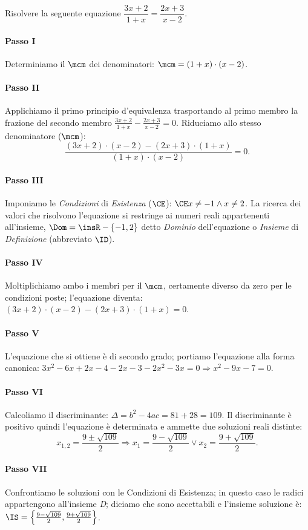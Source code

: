 \begin{esempio}
Risolvere la seguente equazione \(\dfrac{3 x + 2}{1 + x}=\dfrac{2 x + 3}{x - 2}\).
 \paragraph{Passo I} Determiniamo il \(\mcm\) dei denominatori: \(\mcm = ( 1 + x ) 
\cdot ( x - 2 )\).
 \paragraph{Passo II} Applichiamo il primo principio d'equivalenza 
trasportando 
al primo membro la frazione del secondo membro \(\frac{3 x + 2}{1 + x} - 
\frac{2 
x + 3}{x - 2} = 0\). Riduciamo allo stesso denominatore (\(\mcm\)): 
\[\frac{( 3 x + 2 ) \cdot ( x - 2 ) - ( 2 x + 3 ) \cdot ( 1 + x )}{( 1 +x ) 
\cdot ( x - 2 )}=0.\]
 \paragraph{Passo III} Imponiamo le \emph{Condizioni} di \emph{Esistenza} 
(\(\CE\)): \(\CE x \neq - 1 \wedge x \neq 2\). La ricerca dei valori che 
risolvono 
l'equazione si restringe ai numeri reali appartenenti all'insieme, \(\Dom = 
\insR 
- \{- 1, 2 \}\) detto \emph{Dominio} dell'equazione o \emph{Insieme} di 
\emph{Definizione} (abbreviato \(\ID\)).
 \paragraph{Passo IV} Moltiplichiamo ambo i membri per il \(\mcm\), certamente 
diverso da zero per le condizioni poste; l'equazione diventa: \(( 3 x + 2 ) 
\cdot 
( x - 2 ) - ( 2 x + 3 ) \cdot ( 1 + x )=0\).
 \paragraph{Passo V} L'equazione che si ottiene è di secondo grado; portiamo 
l'equazione alla forma canonica: \(3 x^{2} - 6 x + 2 x - 4 - 2 x - 3 - 2 x^{2} - 
3 x=0 \Rightarrow x^{2} - 9 x - 7=0\).
 \paragraph{Passo VI} Calcoliamo il discriminante: \(\Delta=b^{2} - 4 a c=81 + 
28 
= 109\). Il discriminante è positivo quindi l'equazione è determinata e ammette 
due soluzioni reali distinte: 
\[x_{1,2}=\frac{9 \pm \sqrt{109}}{2} \Rightarrow x_{1}=\frac{9 - \sqrt{109}}{2} 
\vee x_{2}=\frac{9 + \sqrt{109}}{2}.\]
 \paragraph{Passo VII} Confrontiamo le soluzioni con le Condizioni di 
Esistenza; 
in questo caso le radici appartengono all'insieme \emph{D}; diciamo che sono 
accettabili e l'insieme soluzione è: \(\IS=\left\{\frac{9 - \sqrt{109}}{2}, 
\frac{9 +\sqrt{109}}{2} \right\}\).
 \end{esempio}

